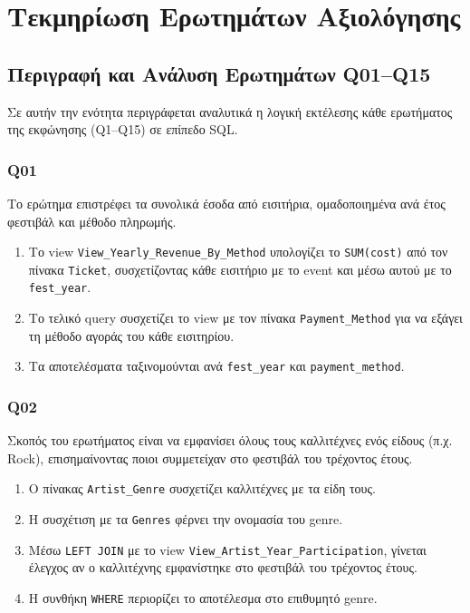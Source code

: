\documentclass[13pt]{extarticle}
\begin{document}
\clearpage
\section{Τεκμηρίωση Ερωτημάτων Αξιολόγησης}
\subsection{Περιγραφή και Ανάλυση Ερωτημάτων Q01–Q15}

Σε αυτήν την ενότητα περιγράφεται αναλυτικά η λογική εκτέλεσης κάθε ερωτήματος της εκφώνησης (Q1–Q15) σε επίπεδο SQL.

\subsubsection{Q01}

Το ερώτημα επιστρέφει τα συνολικά έσοδα από εισιτήρια, ομαδοποιημένα ανά έτος φεστιβάλ και μέθοδο πληρωμής.

\begin{enumerate}
    \item Το view \texttt{View\_Yearly\_Revenue\_By\_Method} υπολογίζει το \texttt{SUM(cost)} από τον πίνακα \texttt{Ticket}, συσχετίζοντας κάθε εισιτήριο με το event και μέσω αυτού με το \texttt{fest\_year}.
    \item Το τελικό query συσχετίζει το view με τον πίνακα \texttt{Payment\_Method} για να εξάγει τη μέθοδο αγοράς του κάθε εισιτηρίου.
    \item Τα αποτελέσματα ταξινομούνται ανά \texttt{fest\_year} και \texttt{payment\_method}.
\end{enumerate}

\subsubsection{Q02}

Σκοπός του ερωτήματος είναι να εμφανίσει όλους τους καλλιτέχνες ενός είδους (π.χ. Rock), επισημαίνοντας ποιοι συμμετείχαν στο φεστιβάλ του τρέχοντος έτους.

\begin{enumerate}
    \item Ο πίνακας \texttt{Artist\_Genre} συσχετίζει καλλιτέχνες με τα είδη τους.
    \item Η συσχέτιση με τα \texttt{Genres} φέρνει την ονομασία του genre.
    \item Μέσω \texttt{LEFT JOIN} με το view \texttt{View\_Artist\_Year\_Participation}, γίνεται έλεγχος αν ο καλλιτέχνης εμφανίστηκε στο φεστιβάλ του τρέχοντος έτους.
    \item Η συνθήκη \texttt{WHERE} περιορίζει το αποτέλεσμα στο επιθυμητό genre.
\end{enumerate}
\end{document}
